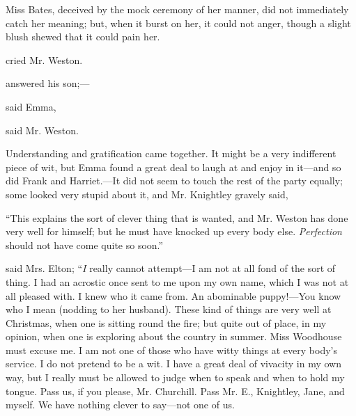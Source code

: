 
Miss Bates, deceived by the mock ceremony of her manner, did not immediately catch her meaning; but, when it burst on her, it could not anger, though a slight blush shewed that it could pain her.


 cried Mr. Weston. 

 answered his son;---

 said Emma, 

 said Mr. Weston. 



Understanding and gratification came together. It might be a very indifferent piece of wit, but Emma found a great deal to laugh at and enjoy in it---and so did Frank and Harriet.---It did not seem to touch the rest of the party equally; some looked very stupid about it, and Mr. Knightley gravely said,

“This explains the sort of clever thing that is wanted, and Mr. Weston has done very well for himself; but he must have knocked up every body else. {\em Perfection} should not have come quite so soon.”

 said Mrs. Elton; “{\em I} really cannot attempt---I am not at all fond of the sort of thing. I had an acrostic once sent to me upon my own name, which I was not at all pleased with. I knew who it came from. An abominable puppy!---You know who I mean (nodding to her husband). These kind of things are very well at Christmas, when one is sitting round the fire; but quite out of place, in my opinion, when one is exploring about the country in summer. Miss Woodhouse must excuse me. I am not one of those who have witty things at every body's service. I do not pretend to be a wit. I have a great deal of vivacity in my own way, but I really must be allowed to judge when to speak and when to hold my tongue. Pass us, if you please, Mr. Churchill. Pass Mr. E., Knightley, Jane, and myself. We have nothing clever to say---not one of us.

